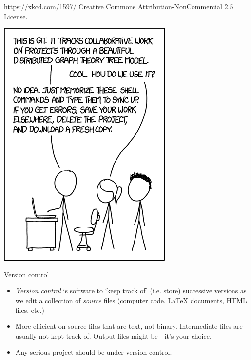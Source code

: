 \documentclass[usenames,dvipsnames]{beamer}
\begin{document}
\begin{frame}{\url{https://xkcd.com/1597/} {\tiny Creative Commons Attribution-NonCommercial 2.5 License.}}
  \begin{block}{}
    \begin{center}
      \includegraphics[scale=0.45]{xkcd_1597.png}
    \end{center}
  \end{block}
\end{frame}


\begin{frame}{Version control}
  \begin{block}{}
    \begin{itemize}
      \item{\textit{Version control} is software to `keep track of' (i.e. store) successive versions as we edit a collection of \textit{source} files (computer code, \LaTeX{} documents, HTML files, etc.)}
      \item{More efficient on source files that are text, not binary. Intermediate files are usually not kept track of. Output files might be - it's your choice.}
      \item{Any serious project should be under version control.}
    \end{itemize}
  \end{block}
\end{frame}
\end{document}
